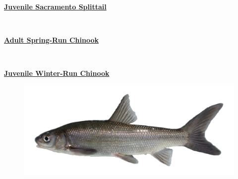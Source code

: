 \documentclass[
]{book}
\begin{document}
\begin{panel-grid}

\begin{columns-nocenter}

\begin{column800}

\textbf{\href{http://calfish.ucdavis.edu/species/?uid=136\&ds=698}{Juvenile Sacramento Splittail}}

\end{column800}

\begin{column40}

~

\end{column40}

\begin{column800}

\textbf{\href{http://calfish.ucdavis.edu/species/?uid=28\&ds=698}{Adult Spring-Run Chinook}}

\end{column800}

\begin{column40}

~

\end{column40}

\begin{column800}

\textbf{\href{http://calfish.ucdavis.edu/species/?uid=30\&ds=698}{Juvenile Winter-Run Chinook}}

\end{column800}

\end{columns-nocenter}

\begin{columns-nocenter}

\begin{column800}

\begin{figure}

{\centering \includegraphics[width=29.17in]{figures/splittail_adult} 

}
\end{figure}
\end{column800}
\end{columns-nocenter}
\end{panel-grid}
\end{document}
